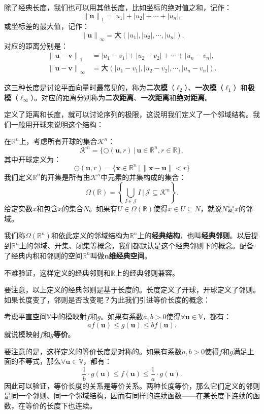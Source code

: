 \documentclass[12pt,UTF8]{ctexbook}
\begin{document}
除了经典长度，我们也可以用其他长度，比如坐标的绝对值之和，记作：
$$ \left\|\mathbf{u}\right\|_1 = |u_1| + |u_2| + \cdots + |u_n|,$$
或坐标差的最大值，记作：
$$ \left\| \mathbf{u} \right\|_{\infty} = \text{大}(|u_1|, |u_2|,\cdots, |u_n|). $$
对应的距离分别是：
\begin{align*}
    \left\|\mathbf{u} - \mathbf{v}\right\|_1\;\, &= |u_1 - v_1| + |u_2 - v_2| + \cdots + |u_n - v_n|,\\
    \left\| \mathbf{u} - \mathbf{v} \right\|_{\infty} &= \text{大}(|u_1 - v_1|, |u_2 - v_2|,\cdots, |u_n - v_n|).   
\end{align*}
 
这三种长度是讨论平面向量时最常见的，称为\textbf{二次模}（$\ell_2$）、\textbf{一次模}（$\ell_1$）和\textbf{极模}（$\ell_{\infty}$）。对应的距离分别称为\textbf{二次距离}、\textbf{一次距离}和\textbf{绝对距离}。

定义了距离和长度，就可以讨论序列的极限，这说明我们定义了一个邻域结构。我们一般用开球来说明这个结构：
\begin{df}
    在$\mathbb{R}^n$上，考虑所有开球的集合$\mathcal{K}^n$：
    $$ \mathcal{K}^n = \{ \bigcirc(\mathbf{u}, r) \, | \, \mathbf{u} \in \mathbb{R}^n, r \in \mathbb{R} \},$$
    其中开球定义为：
    $$ \bigcirc(\mathbf{u},r) = \{ \mathbf{x}\in \mathbb{R}^n\,|\, \| \mathbf{x} - \mathbf{u}\| < r\} $$
    我们定义$\mathbb{R}^n$的开集是所有由$\mathcal{K}^n$中元素的并集构成的集合：
    $$ \Omega(\mathbb{R}) = \left\{\bigcup_{I \in \mathcal{J}} I \, \Bigg| \,\mathcal{J} \subseteq  \mathcal{K}^n \right\}.$$
    给定实数$x$和包含$x$的集合$N$。如果有$U\in\Omega(\mathbb{R})$使得$x\in U\subseteq N$，就说$N$是$x$的邻域。

    我们称$\Omega(\mathbb{R}^n)$和依此定义的邻域结构为$\mathbb{R}^n$上的\textbf{经典结构}，也叫\textbf{经典邻则}。以后提到$\mathbb{R}^n$上的邻域、开集、闭集等概念，我们都默认是这个经典邻则下的概念。配备了经典内积和邻则的空间$\mathbb{R}^n$叫做$\boldsymbol{n}$\textbf{维经典空间}。
\end{df}

不难验证，这样定义的经典邻则和$\mathbb{R}$上的经典邻则兼容。

要注意，以上定义的经典邻则是基于长度的。长度定义了开球，开球定义了邻则。如果长度变了，邻则是否改变呢？为此我们引进等价长度的概念：
\begin{df}
    考虑平直空间$\mathbb{V}$中的模映射$f$和$g$。如果有系数$a,b>0$使得$\forall \mathbf{u} \in \mathbb{V}$，都有：
    $$ af(\mathbf{u}) \leqslant g(\mathbf{u}) \leqslant bf(\mathbf{u}).$$
    就说模映射$f$和$g$\textbf{等价}。
\end{df}
要注意的是，这样定义的等价长度是对称的。如果有系数$a,b>0$使得$f$和$g$满足上面的不等式，那么$\forall \mathbf{u} \in \mathbb{V}$，都有：
$$ \frac{1}{b}\cdot g(\mathbf{u}) \leqslant f(\mathbf{u}) \leqslant \frac{1}{a}\cdot g(\mathbf{u}). $$
因此可以验证，等价长度的关系是等价关系。两种长度等价，那么它们定义的邻则是同一个邻则、同一个邻域结构，因而有同样的连续函数——在某长度下连续的函数，在等价的长度下也连续。
\end{document}
